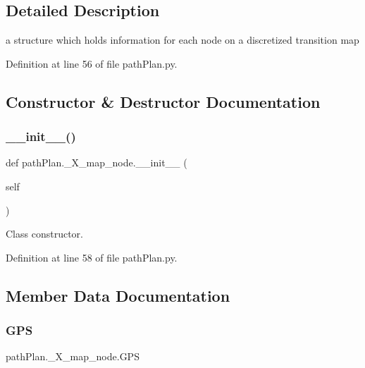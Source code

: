 \subsection{Detailed Description}
a structure which holds information for each node on a discretized transition map 

Definition at line 56 of file path\+Plan.\+py.



\subsection{Constructor \& Destructor Documentation}
\mbox{\label{classpath_plan_1_1___x__map__node_a73f6059a5ffe61cf3c79d9ac682ccf92}} 
\subsubsection{\texorpdfstring{\+\_\+\+\_\+init\+\_\+\+\_\+()}{\_\_init\_\_()}}
{\footnotesize\ttfamily def path\+Plan.\+\_\+\+X\+\_\+map\+\_\+node.\+\_\+\+\_\+init\+\_\+\+\_\+ (\begin{DoxyParamCaption}\item[{}]{self }\end{DoxyParamCaption})}



Class constructor. 



Definition at line 58 of file path\+Plan.\+py.



\subsection{Member Data Documentation}
\mbox{\label{classpath_plan_1_1___x__map__node_a4d104762b4f90c3b130ff6292732299d}} 
\subsubsection{\texorpdfstring{G\+PS}{GPS}}
{\footnotesize\ttfamily path\+Plan.\+\_\+\+X\+\_\+map\+\_\+node.\+G\+PS}



